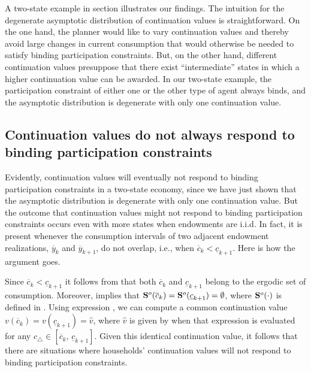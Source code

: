A two-state example in section  illustrates our
findings. The intuition for the degenerate asymptotic distribution
of continuation values is straightforward. On the one hand,
the planner would
like to vary continuation values and thereby avoid large changes
in current consumption that would otherwise be needed to satisfy
binding participation constraints. But, on the other hand,
different continuation
values presuppose that there exist ``intermediate'' states in
which a higher continuation value can be  awarded. In our
two-state example, the participation constraint  of either one or
the other type of agent always  binds, and the asymptotic
distribution is degenerate with only one continuation value.



\subsection{Continuation values do not always respond to binding
participation constraints}
Evidently, continuation values will eventually not respond to
binding participation constraints in a two-state economy, since we
have just shown that the asymptotic distribution is degenerate
with only one continuation value. But the outcome that
continuation values might not respond to binding participation
constraints occurs even with more states when endowments are
i.i.d. In fact, it is present whenever the consumption intervals
of two adjacent endowment realizations, $\overline y_k$ and
$\overline y_{k+1}$, do not overlap, i.e., when $\overline c_k <
\underline c_{k+1}$. Here is how the argument goes.

Since $\overline c_k < \underline c_{k+1}$ it follows from
 that both $\overline c_k$ and $\underline c_{k+1}$
belong to the ergodic set of consumption. Moreover,
 implies that ${\bf S}^o(\overline c_k) = {\bf
S}^o(\underline c_{k+1}) = \emptyset$, where ${\bf S}^o(\cdot)$ is
defined in . Using expression , we can
compute a common continuation value $v(\overline c_k)=v(\underline
c_{k+1}) = \hat v$, where $\hat v$ is given by 
when that expression is evaluated for any $c_{\triangle} \in
[\overline c_k,\, \underline c_{k+1}]$. Given this identical
continuation value, it follows that there are situations where
households' continuation values will not  respond to binding
participation constraints.


\newpage


